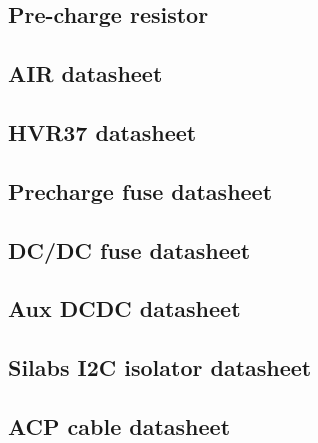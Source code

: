 \subsection{Pre-charge resistor}\label{app:precharge_resistors}
	

\subsection{AIR datasheet}\label{app:air_datasheet}
	
	
\subsection{HVR37 datasheet}\label{app:hvr37_datasheet}
	
	
\subsection{Precharge fuse datasheet}\label{app:precharge_fuse_datasheet}
	

\subsection{DC/DC fuse datasheet}\label{app:dcdc_fuse_datasheet}
	

\subsection{Aux DCDC datasheet}\label{app:aux_dcdc_datasheet}
	

\subsection{Silabs I2C isolator datasheet}\label{app:ecua_isloator_datasheet}
	

\subsection{ACP cable datasheet}\label{app:PowerConductor}
	




\label{app:XT60connector}
